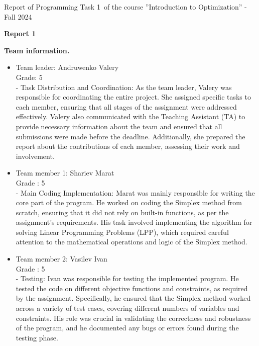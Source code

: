 \documentclass[12pt, legalpaper]{exam}
\newcommand{\course}{Introduction to Optimization}
\newcommand{\term}{Fall 2024}
\newcommand{\examnum}{Report of Programming Task 1}
\begin{document}
\noindent \examnum \, of the  course ''\course'' - \term


\noindent
{}




\vspace{12pt}
\begin{center}
    \textbf{Report 1}
\end{center}

\vspace{12pt}

\noindent  \textbf{Team information.}

\begin{itemize}
    \item Team leader: Andruwenko Valery 
    \\Grade: 5
    \\ - Task Distribution and Coordination: As the team leader, Valery was responsible for coordinating the entire project. She assigned specific tasks to each member, ensuring that all stages of the assignment were addressed effectively. Valery also communicated with the Teaching Assistant (TA) to provide necessary information about the team and ensured that all submissions were made before the deadline. Additionally, she prepared the report about the contributions of each member, assessing their work and involvement.
    \item Team member 1: Shariev Marat 
    \\Grade : 5
    \\ - Main Coding Implementation: Marat was mainly responsible for writing the core part of the program. He worked on coding the Simplex method from scratch, ensuring that it did not rely on built-in functions, as per the assignment's requirements. His task involved implementing the algorithm for solving Linear Programming Problems (LPP), which required careful attention to the mathematical operations and logic of the Simplex method.
    \item Team member 2: Vasilev Ivan
    \\ Grade : 5
    \\- Testing: Ivan was responsible for testing the implemented program. He tested the code on different objective functions and constraints, as required by the assignment. Specifically, he ensured that the Simplex method worked across a variety of test cases, covering different numbers of variables and constraints. His role was crucial in validating the correctness and robustness of the program, and he documented any bugs or errors found during the testing phase.

\end{itemize}
\end{document}

